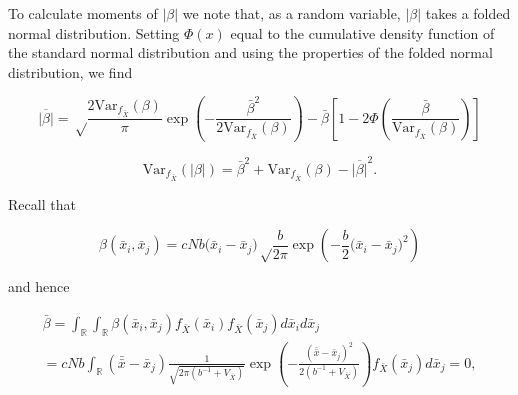 \documentclass[]{article}
\begin{document}
To calculate moments of \(|\beta|\) we note that, as a random variable,
\(|\beta|\) takes a folded normal distribution. Setting \(\Phi(x)\)
equal to the cumulative density function of the standard normal
distribution and using the properties of the folded normal distribution,
we find

\begin{equation}
\overline{|\beta|}=\sqrt\frac{2\mathrm{Var}_{f_{\bar X}}(\beta)}{\pi}\exp\left(-\frac{\bar\beta^2}{2\mathrm{Var}_{f_{\bar X}}(\beta)}\right)-\bar\beta\left[1-2\Phi\left(\frac{\bar\beta}{\mathrm{Var}_{f_{\bar X}}(\beta)}\right)\right]
\end{equation}

\begin{equation}
\mathrm{Var}_{f_{\bar X}}(|\beta|)=\bar\beta^2+\mathrm{Var}_{f_{\bar X}}(\beta)-\overline{|\beta|}^2.
\end{equation}

Recall that

\begin{equation}
\beta(\bar x_i,\bar x_j)=cNb\big(\bar x_i-\bar x_j\big)\sqrt\frac{b}{2\pi}\exp\left(-\frac{b}{2}\big(\bar x_i-\bar x_j\big)^2\right)
\end{equation}

and hence

\begin{multline}
\bar\beta=
\int_\mathbb{R}\int_\mathbb{R}\beta(\bar x_i,\bar x_j)f_{\bar X}(\bar x_i)f_{\bar X}(\bar x_j)d\bar x_id\bar x_j \\
= cNb\int_\mathbb{R}(\bar{\bar x}-\bar x_j)\frac{1}{\sqrt{2\pi(b^{-1}+V_{\bar X})}}\exp\left(-\frac{(\bar{\bar x}-\bar x_j)^2}{2(b^{-1}+V_{\bar X})}\right)f_{\bar X}(\bar x_j)d\bar x_j=0,
\end{multline}
\end{document}
